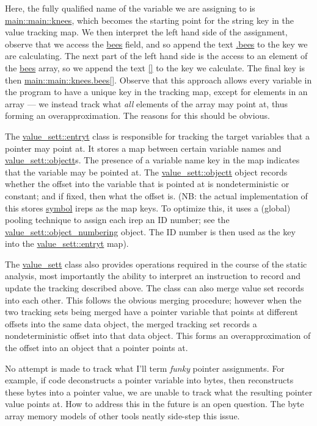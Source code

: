 \documentclass{article}
\begin{document}
Here, the fully qualified name of the variable we are assigning to is
\url{main::main::knees}, which becomes the starting point for the string
key in the value tracking map. We then interpret the left hand side of the
assignment, observe that we access the \url{bees} field, and so append the
text \url{.bees} to the key we are calculating. The next part of the left
hand side is the access to an element of the \url{bees} array, so we
append the text \url{[]} to the key we calculate. The final key is then
\url{main::main::knees.bees[]}. Observe that this approach allows every
variable in the program to have a unique key in the tracking map, except for
elements in an array --- we instead track what \textit{all} elements of the
array may point at, thus forming an overapproximation. The reasons for this
should be obvious.

The \url{value_sett::entryt} class is responsible for tracking the target
variables that a pointer may point at. It stores a map between certain variable
names and \url{value_sett::objectt}s. The presence of a variable name key
in the map indicates that the variable may be pointed at. The
\url{value_sett::objectt} object records whether the offset into the
variable that is pointed at is nondeterministic or constant; and if fixed,
then what the offset is. (NB: the actual implementation of this stores
\url{symbol} ireps as the map keys. To optimize this, it uses a (global)
pooling technique to assign each irep an ID number; see the
\url{value_sett::object_numbering} object. The ID number is then used
as the key into the \url{value_sett::entryt} map).

The \url{value_sett} class also provides operations required in the course
of the static analysis, most importantly the ability to interpret an instruction
to record and update the tracking described above. The class can also merge
value set records into each other. This follows the obvious merging procedure;
however when the two tracking sets being merged have a pointer variable
that points at different offsets into the same data object, the merged
tracking set records a nondeterministic offset into that data object. This
forms an overapproximation of the offset into an object that a pointer points
at.

No attempt is made to track what I'll term \textit{funky} pointer assignments.
For example, if code deconstructs a pointer variable into bytes, then
reconstructs these bytes into a pointer value, we are unable to track
what the resulting pointer value points at. How to address this in the future
is an open question. The byte array memory models of other tools neatly
side-step this issue.
\end{document}
